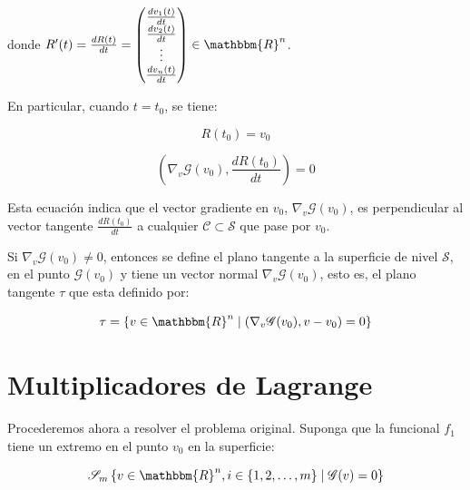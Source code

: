             donde $R'(t) = \frac{dR(t)}{dt} = \begin{pmatrix} \frac{d v_1(t)}{dt} \\ \frac{d v_2(t)}{dt} \\ \vdots \\ \frac{d v_n(t)}{dt} \end{pmatrix} \in \mathbbm{R}^n$.

            En particular, cuando $t = t_0$, se tiene:

            \begin{equation*}
                R(t_0) = v_0
            \end{equation*}

            \begin{equation*}
                \left( \nabla_v \mathscr{G}(v_0), \frac{dR(t_0)}{dt} \right) = 0
            \end{equation*}

            Esta ecuación indica que el vector gradiente en $v_0$, $\nabla_v \mathscr{G}(v_0)$,  es perpendicular al vector tangente $\frac{dR(t_0)}{dt}$ a cualquier $\mathscr{C} \subset \mathscr{S}$ que pase por $v_0$.



            Si $\nabla_v \mathscr{G}(v_0) \ne 0$, entonces se define el plano tangente a la superficie de nivel $\mathscr{S}$, en el punto $\mathscr{G}(v_0)$ y tiene un vector normal $\nabla_v \mathscr{G}(v_0)$, esto es, el plano tangente $\tau$ que esta definido por:

            \begin{equation}
                \tau = \left\{ v \in \mathbbm{R}^n \mid \left( \nabla_v \mathscr{G}(v_0), v - v_0 \right) = 0 \right\}
            \end{equation}

    \newpage
    \section{Multiplicadores de Lagrange}

        Procederemos ahora a resolver el problema original. Suponga que la funcional $f_1$ tiene un extremo en el punto $v_0$ en la superficie:

        \begin{equation}
            \mathscr{S}_m \left\{ v \in \mathbbm{R}^n, i \in \left\{ 1, 2, \dots, m \right\} \mid \mathscr{G}(v) = 0 \right\}
        \end{equation}

